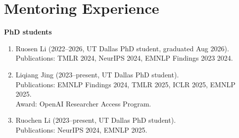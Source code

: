 \section{Mentoring Experience}

\noindent \textbf{PhD students}
\begin{enumerate}[label={},leftmargin=15pt]

\item Ruosen Li (2022--2026, UT Dallas PhD student, graduated Aug 2026). \\
Publications: TMLR 2024, NeurIPS 2024, EMNLP Findings 2023 2024. 

\vspace{1mm}
\item Liqiang Jing (2023--present, UT Dallas PhD student). \\
Publications: EMNLP Findings 2024, TMLR 2025, ICLR 2025, EMNLP 2025. \\
Award: OpenAI Researcher Access Program.

\vspace{1mm}
\item Ruochen Li (2023--present, UT Dallas PhD student). \\
Publications: NeurIPS 2024, EMNLP 2025.


\end{enumerate}


